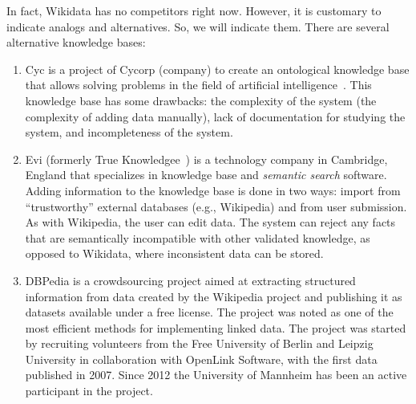 In fact, Wikidata has no competitors right now. However, it is customary to indicate analogs and alternatives. So, we will indicate them. There are several alternative knowledge bases:
\begin{enumerate}
\item Cyc is a project of Cycorp (company) to create an ontological knowledge base 
    that allows solving problems in the field of artificial intelligence~. 
        This knowledge base has some drawbacks: 
        the complexity of the system (the complexity of adding data manually), 
        lack of documentation for studying the system, and incompleteness of the system. 

\item Evi (formerly True Knowledgee~) 
    is a technology company in Cambridge, England that specializes in knowledge base 
        and 
        \textit{semantic search} software. 
        Adding information to the knowledge base is done in two ways: 
        import from ``trustworthy'' external databases (e.g., Wikipedia) 
        and from user submission. 
        As with Wikipedia, the user can edit data. 
        The system can reject any facts that are semantically incompatible 
        with other validated knowledge, 
        as opposed to Wikidata, where inconsistent data can be stored.

\item DBPedia is a crowdsourcing project aimed at extracting structured information 
    from data created by the Wikipedia project 
        and publishing it as datasets available under a free license. 
        The project was noted as one of the most efficient methods 
        for implementing linked data. The project was started by recruiting volunteers 
        from the Free University of Berlin and Leipzig University 
        in collaboration with OpenLink Software, 
        with the first data published in 2007. 
        Since 2012 the University of Mannheim has been an active participant in the project.
\end{enumerate}


